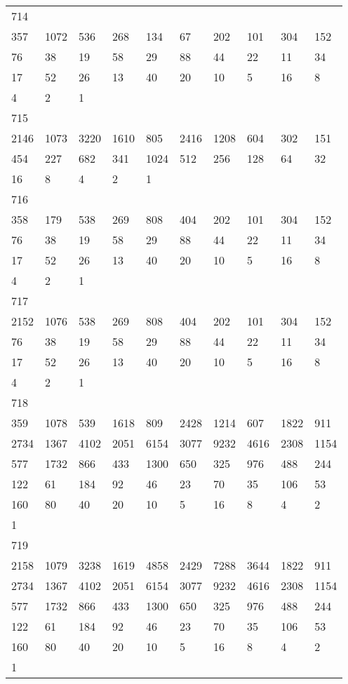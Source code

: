 \begin{longtable}{*{10}{l}}
714&&&&&&&&&\\
357& 1072& 536& 268& 134& 67& 202& 101& 304& 152\\
76& 38& 19& 58& 29& 88& 44& 22& 11& 34\\
17& 52& 26& 13& 40& 20& 10& 5& 16& 8\\
4& 2& 1& \\

715&&&&&&&&&\\
2146& 1073& 3220& 1610& 805& 2416& 1208& 604& 302& 151\\
454& 227& 682& 341& 1024& 512& 256& 128& 64& 32\\
16& 8& 4& 2& 1& \\

716&&&&&&&&&\\
358& 179& 538& 269& 808& 404& 202& 101& 304& 152\\
76& 38& 19& 58& 29& 88& 44& 22& 11& 34\\
17& 52& 26& 13& 40& 20& 10& 5& 16& 8\\
4& 2& 1& \\

717&&&&&&&&&\\
2152& 1076& 538& 269& 808& 404& 202& 101& 304& 152\\
76& 38& 19& 58& 29& 88& 44& 22& 11& 34\\
17& 52& 26& 13& 40& 20& 10& 5& 16& 8\\
4& 2& 1& \\

718&&&&&&&&&\\
359& 1078& 539& 1618& 809& 2428& 1214& 607& 1822& 911\\
2734& 1367& 4102& 2051& 6154& 3077& 9232& 4616& 2308& 1154\\
577& 1732& 866& 433& 1300& 650& 325& 976& 488& 244\\
122& 61& 184& 92& 46& 23& 70& 35& 106& 53\\
160& 80& 40& 20& 10& 5& 16& 8& 4& 2\\
1& \\

719&&&&&&&&&\\
2158& 1079& 3238& 1619& 4858& 2429& 7288& 3644& 1822& 911\\
2734& 1367& 4102& 2051& 6154& 3077& 9232& 4616& 2308& 1154\\
577& 1732& 866& 433& 1300& 650& 325& 976& 488& 244\\
122& 61& 184& 92& 46& 23& 70& 35& 106& 53\\
160& 80& 40& 20& 10& 5& 16& 8& 4& 2\\
1& \\


\end{longtable}
